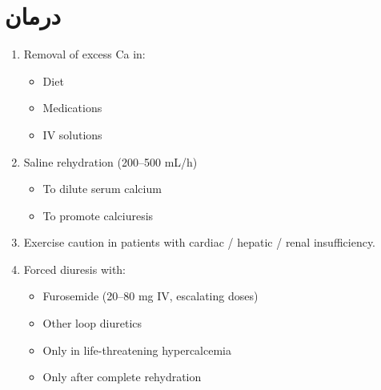 \documentclass[a4paper,12pt]{article}
\begin{document}
\section*{درمان }
\begin{latin}
\begin{enumerate}[label=\arabic*.,start=1]
\item Removal of excess Ca in:
\begin{itemize}
\item Diet
\item Medications
\item IV solutions
\end{itemize}
\item Saline rehydration (200--500 mL/h)
\begin{itemize}
\item To dilute serum calcium
\item To promote calciuresis
\end{itemize}
\item Exercise caution in patients with cardiac / hepatic / renal insufficiency.
\item Forced diuresis with:
\begin{itemize}
\item Furosemide (20--80 mg IV, escalating doses)
\item Other loop diuretics
\end{itemize}
\begin{itemize}
\item Only in life-threatening hypercalcemia
\item Only after complete rehydration
\end{itemize}
\end{enumerate}
\end{latin}
\end{document}
